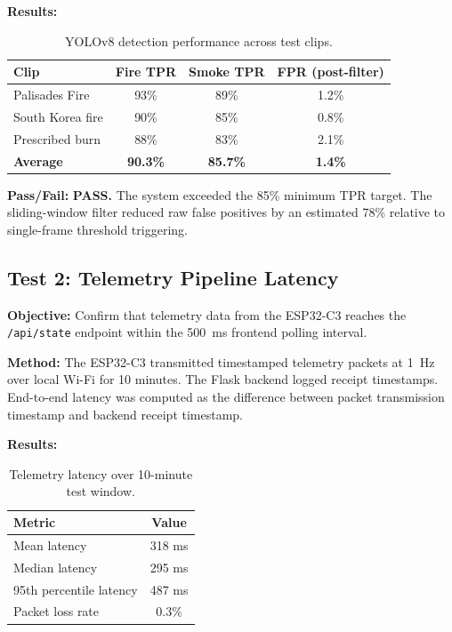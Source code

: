 \documentclass[journal, onecolumn]{IEEEtran}
\begin{document}
\textbf{Results:}
\begin{table}[H]
\centering
\small
\begin{tabular}{|l|c|c|c|}
\hline
\textbf{Clip} & \textbf{Fire TPR} & \textbf{Smoke TPR} & \textbf{FPR (post-filter)} \\
\hline
Palisades Fire & 93\% & 89\% & 1.2\% \\
\hline
South Korea fire & 90\% & 85\% & 0.8\% \\
\hline
Prescribed burn & 88\% & 83\% & 2.1\% \\
\hline
\textbf{Average} & \textbf{90.3\%} & \textbf{85.7\%} & \textbf{1.4\%} \\
\hline
\end{tabular}
\caption{YOLOv8 detection performance across test clips.}
\end{table}

\textbf{Pass/Fail:} \textbf{PASS.} The system exceeded the 85\% minimum TPR target. The sliding-window filter reduced raw false positives by an estimated 78\% relative to single-frame threshold triggering.

\subsection{Test 2: Telemetry Pipeline Latency}

\textbf{Objective:} Confirm that telemetry data from the ESP32-C3 reaches the \texttt{/api/state} endpoint within the 500~ms frontend polling interval.

\textbf{Method:} The ESP32-C3 transmitted timestamped telemetry packets at 1~Hz over local Wi-Fi for 10 minutes. The Flask backend logged receipt timestamps. End-to-end latency was computed as the difference between packet transmission timestamp and backend receipt timestamp.

\textbf{Results:}
\begin{table}[H]
\centering
\small
\begin{tabular}{|l|c|}
\hline
\textbf{Metric} & \textbf{Value} \\
\hline
Mean latency & 318 ms \\
\hline
Median latency & 295 ms \\
\hline
95th percentile latency & 487 ms \\
\hline
Packet loss rate & 0.3\% \\
\hline
\end{tabular}
\caption{Telemetry latency over 10-minute test window.}
\end{table}
\end{document}

